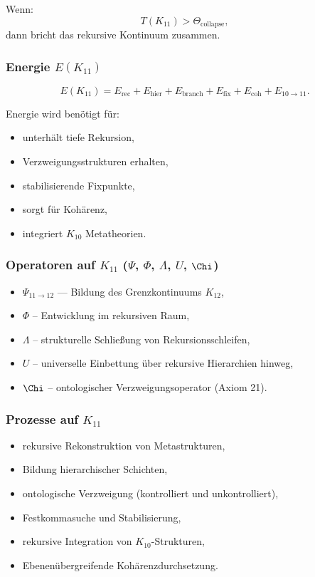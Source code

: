 Wenn:
\[
T(K_{11}) > \Theta_{\mathrm{collapse}},
\]
dann bricht das rekursive Kontinuum zusammen.

\subsubsection{Energie $E(K_{11})$}

\[
E(K_{11})=
E_{\mathrm{rec}}+
E_{\mathrm{hier}}+
E_{\mathrm{branch}}+
E_{\mathrm{fix}}+
E_{\mathrm{coh}}+
E_{10\to11}.
\]

Energie wird benötigt für:
\begin{itemize}
    \item unterhält tiefe Rekursion,
    \item Verzweigungsstrukturen erhalten,
    \item stabilisierende Fixpunkte,
    \item sorgt für Kohärenz,
    \item integriert $K_{10}$ Metatheorien.
\end{itemize}

\subsubsection{Operatoren auf $K_{11}$ ($\Psi$, $\Phi$, $\Lambda$, $U$, $\Chi$)}

\begin{itemize}
    \item $\Psi_{11\to12}$ — Bildung des Grenzkontinuums $K_{12}$,
    \item $\Phi$ – Entwicklung im rekursiven Raum,
    \item $\Lambda$ – strukturelle Schließung von Rekursionsschleifen,
    \item $U$ – universelle Einbettung über rekursive Hierarchien hinweg,
    \item $\Chi$ – ontologischer Verzweigungsoperator (Axiom 21).
\end{itemize}

\subsubsection{Prozesse auf $K_{11}$}

\begin{itemize}
    \item rekursive Rekonstruktion von Metastrukturen,
    \item Bildung hierarchischer Schichten,
    \item ontologische Verzweigung (kontrolliert und unkontrolliert),
    \item Festkommasuche und Stabilisierung,
    \item rekursive Integration von $K_{10}$-Strukturen,
    \item Ebenenübergreifende Kohärenzdurchsetzung.
\end{itemize}

